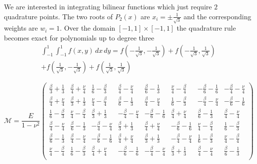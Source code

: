 \documentclass[11pt]{article}
\begin{document}
We are interested in integrating bilinear functions which just require $2$ quadrature points. The two roots of $P_2(x)$ are $x_i = \pm \frac{1}{\sqrt{3}}$ and the corresponding weights are $w_i = 1$. Over the domain $[-1,1]\times[-1,1]$ the quadrature rule becomes exact for polynomials up to degree three
\begin{multline}
	\int_{-1}^1 \int_{-1}^1 f(x,y) \, dx \, dy = f\left(-\frac{1}{\sqrt{3}}, -\frac{1}{\sqrt{3}}\right) + f\left(-\frac{1}{\sqrt{3}}, \frac{1}{\sqrt{3}}\right) \\
	+ f\left(\frac{1}{\sqrt{3}}, -\frac{1}{\sqrt{3}}\right) + f\left(\frac{1}{\sqrt{3}}, \frac{1}{\sqrt{3}}\right)
\end{multline}

\begin{equation}
\mathcal{M} = \frac{E}{1-\nu^2}
\begin{pmatrix}
 	\frac{\beta}{3} + \frac{1}{3} &   \frac{\beta}{4} + \frac{\nu}{4} & \frac{1}{6} - \frac{\beta}{3} &   \frac{\beta}{4} - \frac{\nu}{4} & \frac{\beta}{6} - \frac{1}{3} &   \frac{\nu}{4} - \frac{\beta}{4} &  - \frac{\beta}{6} - \frac{1}{6} & - \frac{\beta}{4} - \frac{\nu}{4} \\
	\frac{\beta}{4} + \frac{\nu}{4} & \frac{\beta}{3} + \frac{1}{3} &   \frac{\nu}{4} - \frac{\beta}{4} & \frac{\beta}{6} - \frac{1}{3} &   \frac{\beta}{4} - \frac{\nu}{4} & \frac{1}{6} - \frac{\beta}{3} & - \frac{\beta}{4} - \frac{\nu}{4} &  - \frac{\beta}{6} - \frac{1}{6} \\
	\frac{1}{6} - \frac{\beta}{3} &   \frac{\nu}{4} - \frac{\beta}{4} & \frac{\beta}{3} + \frac{1}{3} & - \frac{\beta}{4} - \frac{\nu}{4} &  - \frac{\beta}{6} - \frac{1}{6} &   \frac{\beta}{4} + \frac{\nu}{4} & \frac{\beta}{6} - \frac{1}{3} &   \frac{\beta}{4} - \frac{\nu}{4} \\
	\frac{\beta}{4} - \frac{\nu}{4} & \frac{\beta}{6} - \frac{1}{3} & - \frac{\beta}{4} - \frac{\nu}{4} & \frac{\beta}{3} + \frac{1}{3} &   \frac{\beta}{4} + \frac{\nu}{4} &  - \frac{\beta}{6} - \frac{1}{6} &   \frac{\nu}{4} - \frac{\beta}{4} & \frac{1}{6} - \frac{\beta}{3} \\
	\frac{\beta}{6} - \frac{1}{3} &   \frac{\beta}{4} - \frac{\nu}{4} &  - \frac{\beta}{6} - \frac{1}{6} &   \frac{\beta}{4} + \frac{\nu}{4} & \frac{\beta}{3} + \frac{1}{3} & - \frac{\beta}{4} - \frac{\nu}{4} & \frac{1}{6} - \frac{\beta}{3} &   \frac{\nu}{4} - \frac{\beta}{4} \\
	\frac{\nu}{4} - \frac{\beta}{4} & \frac{1}{6} - \frac{\beta}{3} &   \frac{\beta}{4} + \frac{\nu}{4} &  - \frac{\beta}{6} - \frac{1}{6} & - \frac{\beta}{4} - \frac{\nu}{4} & \frac{\beta}{3} + \frac{1}{3} &   \frac{\beta}{4} - \frac{\nu}{4} & \frac{\beta}{6} - \frac{1}{3} \\

\end{pmatrix}
\end{equation}
\end{document}
